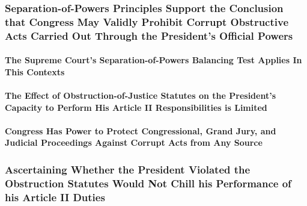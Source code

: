 \subsubsection{Separation-of-Powers Principles Support the Conclusion that Congress May Validly Prohibit Corrupt Obstructive Acts Carried Out Through the President’s Official Powers}

\paragraph{The Supreme Court’s Separation-of-Powers Balancing Test Applies In This Contexts}

\paragraph{The Effect of Obstruction-of-Justice Statutes on the President’s Capacity to Perform His Article II Responsibilities is Limited}

\paragraph{Congress Has Power to Protect Congressional, Grand Jury, and Judicial Proceedings Against Corrupt Acts from Any Source}

\subsubsection{Ascertaining Whether the President Violated the Obstruction Statutes Would Not Chill his Performance of his Article II Duties}
